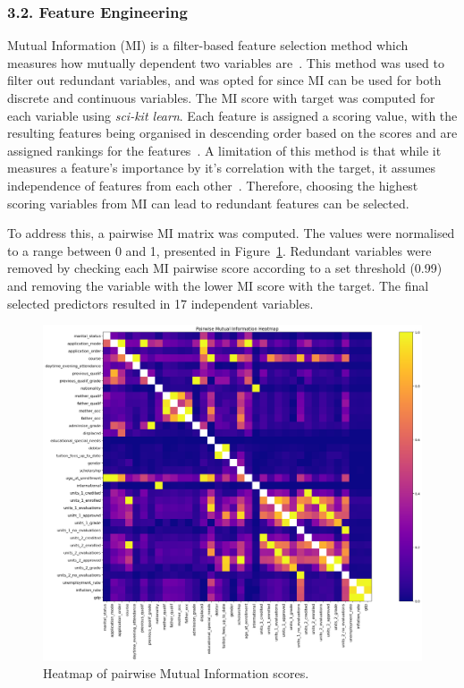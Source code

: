 \documentclass[11pt]{article}
\begin{document}
\subsubsection*{3.2. Feature Engineering}

Mutual Information (MI) is a filter-based feature selection method which measures how mutually dependent two variables are~\cite{venkatesh_anuradha}. This method was used to filter out redundant variables, and was opted for since MI can be used for both discrete and continuous variables. The MI score with target was computed for each variable using \textit{sci-kit learn}. Each feature is assigned a scoring value, with the resulting features being organised in descending order based on the scores and are assigned rankings for the features~\cite{venkatesh_anuradha}. A limitation of this method is that while it measures a feature's importance by it's correlation with the target, it assumes independence of features from each other~\cite{li_etal}. Therefore, choosing the highest scoring variables from MI can lead to redundant features can be selected.

To address this, a pairwise MI matrix was computed. The values were normalised to a range between 0 and 1, presented in Figure~\ref{fig:pairwise_mi}. Redundant variables were removed by checking each MI pairwise score according to a set threshold (0.99) and removing the variable with the lower MI score with the target. The final selected predictors resulted in 17 independent variables.

\begin{figure} [H]
    \centering
    \includegraphics[width=0.8\linewidth]{pairwise_mi}
    \caption{Heatmap of pairwise Mutual Information scores.}\label{fig:pairwise_mi}
  \end{figure}  
\end{document}
